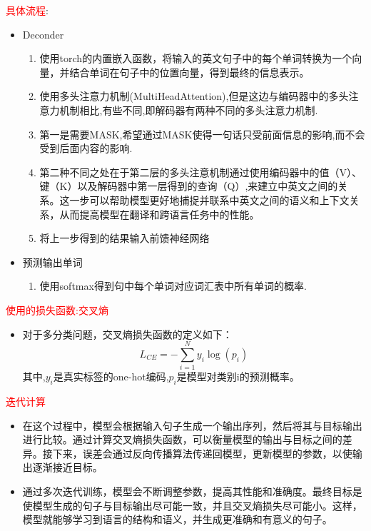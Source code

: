 \documentclass[t]{beamer}
\begin{document}
\begin{CJK*}{UTF8}{gkai}
\begin{frame}
	\textcolor{red}{具体流程}:	
	\begin{itemize}
		\item Deconder
		\begin{enumerate}
			\item 使用torch的内置嵌入函数，将输入的英文句子中的每个单词转换为一个向量，并结合单词在句子中的位置向量，得到最终的信息表示。
			\item 使用多头注意力机制(MultiHeadAttention),但是这边与编码器中的多头注意力机制相比,有些不同,即解码器有两种不同的多头注意力机制.
			\item 第一是需要MASK,希望通过MASK使得一句话只受前面信息的影响,而不会受到后面内容的影响.
			\item 第二种不同之处在于第二层的多头注意机制通过使用编码器中的值（V）、键（K）以及解码器中第一层得到的查询（Q）,来建立中英文之间的关系。这一步可以帮助模型更好地捕捉并联系中英文之间的语义和上下文关系，从而提高模型在翻译和跨语言任务中的性能。
			\item 将上一步得到的结果输入前馈神经网络
		\end{enumerate}
		\item 预测输出单词
		\begin{enumerate}
			\item 使用softmax得到句中每个单词对应词汇表中所有单词的概率.
		\end{enumerate}
	\end{itemize}	
\end{frame}	

\begin{frame}
	\textcolor{red}{使用的损失函数:交叉熵}	\\
	\begin{itemize}
		\item 对于多分类问题，交叉熵损失函数的定义如下：
		$$
			L_{CE} = - \sum_{i=1}^{N} y_i \log(p_i)
		$$
		其中,$y_i$是真实标签的one-hot编码,$p_i$是模型对类别i的预测概率。\\
	\end{itemize}
	
\textcolor{red}{迭代计算}	\\
\begin{itemize}
	\item 在这个过程中，模型会根据输入句子生成一个输出序列，然后将其与目标输出进行比较。通过计算交叉熵损失函数，可以衡量模型的输出与目标之间的差异。接下来，误差会通过反向传播算法传递回模型，更新模型的参数，以使输出逐渐接近目标。
	\item 	通过多次迭代训练，模型会不断调整参数，提高其性能和准确度。最终目标是使模型生成的句子与目标输出尽可能一致，并且交叉熵损失尽可能小。这样，模型就能够学习到语言的结构和语义，并生成更准确和有意义的句子。
\end{itemize}


\end{frame}
\end{CJK*}
\end{document}
